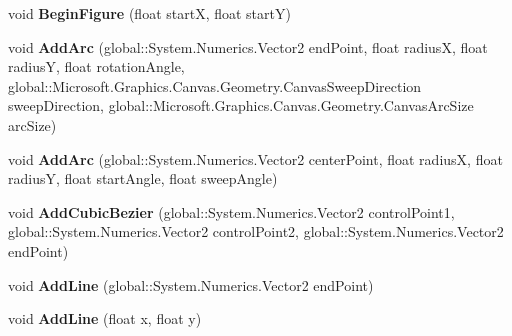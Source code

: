 \begin{DoxyCompactItemize}
void {\bfseries Begin\+Figure} (float startX, float startY)
\item 
\mbox{\label{class_microsoft_1_1_graphics_1_1_canvas_1_1_geometry_1_1_canvas_path_builder_ad5ebacfef42f16ddadc505b289750362}} 
void {\bfseries Add\+Arc} (global\+::\+System.\+Numerics.\+Vector2 end\+Point, float radiusX, float radiusY, float rotation\+Angle, global\+::\+Microsoft.\+Graphics.\+Canvas.\+Geometry.\+Canvas\+Sweep\+Direction sweep\+Direction, global\+::\+Microsoft.\+Graphics.\+Canvas.\+Geometry.\+Canvas\+Arc\+Size arc\+Size)
\item 
\mbox{\label{class_microsoft_1_1_graphics_1_1_canvas_1_1_geometry_1_1_canvas_path_builder_a5bc022c0799cfd3c392f412fc76aeb53}} 
void {\bfseries Add\+Arc} (global\+::\+System.\+Numerics.\+Vector2 center\+Point, float radiusX, float radiusY, float start\+Angle, float sweep\+Angle)
\item 
\mbox{\label{class_microsoft_1_1_graphics_1_1_canvas_1_1_geometry_1_1_canvas_path_builder_a192b933b8c38dcc6fd799668ab3a2e96}} 
void {\bfseries Add\+Cubic\+Bezier} (global\+::\+System.\+Numerics.\+Vector2 control\+Point1, global\+::\+System.\+Numerics.\+Vector2 control\+Point2, global\+::\+System.\+Numerics.\+Vector2 end\+Point)
\item 
\mbox{\label{class_microsoft_1_1_graphics_1_1_canvas_1_1_geometry_1_1_canvas_path_builder_a977ac73b78685510b323dc0f9f9d92a2}} 
void {\bfseries Add\+Line} (global\+::\+System.\+Numerics.\+Vector2 end\+Point)
\item 
\mbox{\label{class_microsoft_1_1_graphics_1_1_canvas_1_1_geometry_1_1_canvas_path_builder_ab36909f8900a9d581be0045841b600a6}} 
void {\bfseries Add\+Line} (float x, float y)
\item 
\mbox{\label{class_microsoft_1_1_graphics_1_1_canvas_1_1_geometry_1_1_canvas_path_builder_a2cf174a6a37788207d5f4464513863e4}} 

\end{DoxyCompactItemize}
